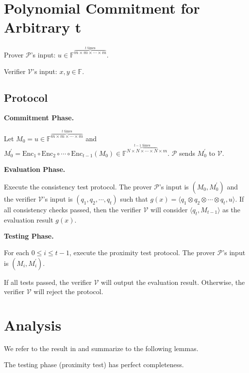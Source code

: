 \section{Polynomial Commitment for Arbitrary t}

Prover $\mathcal{P}$'s input: $u \in \mathbb{F}^{\overbrace{m \times m \times \cdots \times m}^{t \text{ times}}}$.

Verifier $\mathcal{V}$'s input: $x, y \in \mathbb{F}$.

\subsection{Protocol}

\textbf{Commitment Phase.}

Let $M_0 = u \in \mathbb{F}^{\overbrace{m \times m \times \cdots \times m}^{t \text{ times}}}$ and $ M_0^{\prime} = \text{Enc}_1 \circ \text{Enc}_2 \circ \cdots \circ \text{Enc}_{t-1} (M_0) \in \mathbb{F}^{\overbrace{N \times N \times \cdots \times N}^{t-1 \text{ times}} \times m}$. $\mathcal{P}$ sends $M_0^{\prime}$ to $\mathcal{V}$.

\textbf{Evaluation Phase.}

Execute the consistency test protocol. The prover $\mathcal{P}$'s input is $(M_0, M_0^{\prime})$ and the verifier $\mathcal{V}$'s input is $(q_1, q_2, \cdots, q_t)$ such that $g(x) =\langle q_1 \otimes q_2 \otimes \cdots \otimes q_t, u \rangle $.
If all consistency checks passed, then the verifier $\mathcal{V}$ will consider $\langle q_t, M_{t-1} \rangle$ as the evaluation result $g(x)$. 

\textbf{Testing Phase.}

For each $0 \le i \le t-1$, execute the proximity test protocol. The prover $\mathcal{P}$'s input is $(M_i, M_i^{\prime})$.

If all tests passed, the verifier $\mathcal{V}$ will output the evaluation result. Otherwise, the verifier $\mathcal{V}$ will reject the protocol.

\section{Analysis}

We refer to the result in \cite{cryptoeprint:2020/1426} and summarize to the following lemmas. 

\begin{lemma}
\label{lemma:pc-completeness}
The testing phase (proximity test) has perfect completeness.
\end{lemma}

